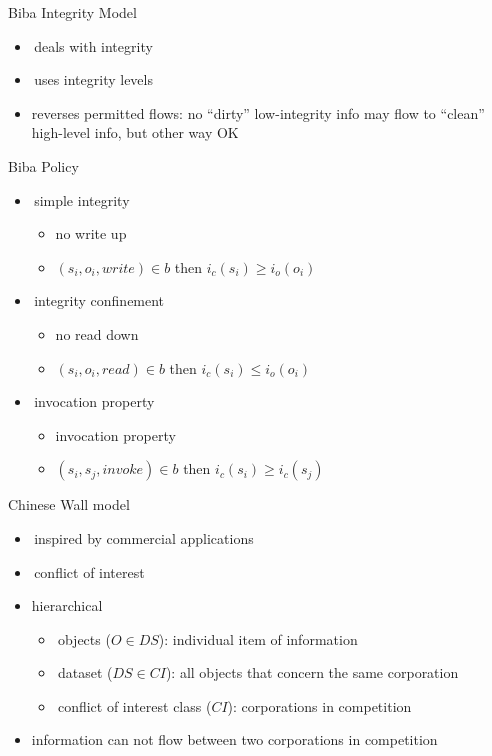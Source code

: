 \documentclass{beamer}
\begin{document}
\begin{frame}{Biba Integrity Model}
  \begin{itemize}
    \item deals with integrity
    \item uses integrity levels
    \item reverses permitted flows: 
      no ``dirty'' low-integrity info may flow to ``clean'' 
      high-level info, but other way OK
  \end{itemize}
\end{frame}

\begin{frame}{Biba Policy}
  \begin{itemize}
    \item simple integrity
      \begin{itemize}
      \item no write up
      \item $(s_i, o_i, write) \in b$ then
        $i_c(s_i) \ge i_o(o_i)$
      \end{itemize}
    \item integrity confinement
      \begin{itemize}
      \item no read down
      \item $(s_i, o_i, read) \in b$ then
        $i_c(s_i) \le i_o(o_i)$
      \end{itemize}
    \item invocation property
      \begin{itemize}
      \item invocation property
      \item $(s_i, s_j, invoke) \in b$ then
        $i_c(s_i) \ge i_c(s_j)$
      \end{itemize}
  \end{itemize}
\end{frame}

\begin{frame}{Chinese Wall model}
  \begin{itemize}
    \item inspired by commercial applications
    \item conflict of interest
    \item hierarchical
      \begin{itemize}
      \item objects ($O \in DS$): individual item of information
      \item dataset ($DS \in CI$): all objects that concern the same corporation
      \item conflict of interest class ($CI$): corporations in competition
      \end{itemize}
    \item information can not flow between two corporations in competition
  \end{itemize}
\end{frame}
\end{document}
